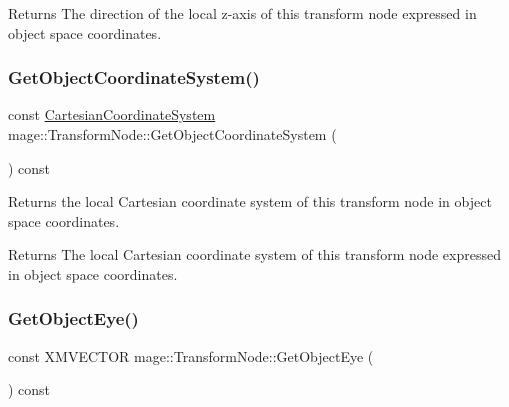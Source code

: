 \begin{DoxyReturn}{Returns}
The direction of the local z-\/axis of this transform node expressed in object space coordinates. 
\end{DoxyReturn}
\hypertarget{structmage_1_1_transform_node_a59417bfb21810840f90cee6a192e6ffd}{}\label{structmage_1_1_transform_node_a59417bfb21810840f90cee6a192e6ffd} 
\subsubsection{\texorpdfstring{Get\+Object\+Coordinate\+System()}{GetObjectCoordinateSystem()}}
{\footnotesize\ttfamily const \hyperlink{structmage_1_1_cartesian_coordinate_system}{Cartesian\+Coordinate\+System} mage\+::\+Transform\+Node\+::\+Get\+Object\+Coordinate\+System (\begin{DoxyParamCaption}{ }\end{DoxyParamCaption}) const\hspace{0.3cm}{\ttfamily [noexcept]}}

Returns the local Cartesian coordinate system of this transform node in object space coordinates.

\begin{DoxyReturn}{Returns}
The local Cartesian coordinate system of this transform node expressed in object space coordinates. 
\end{DoxyReturn}
\hypertarget{structmage_1_1_transform_node_a627c3494fb3bd47551bbc48ad64369f5}{}\label{structmage_1_1_transform_node_a627c3494fb3bd47551bbc48ad64369f5} 
\subsubsection{\texorpdfstring{Get\+Object\+Eye()}{GetObjectEye()}}
{\footnotesize\ttfamily const X\+M\+V\+E\+C\+T\+OR mage\+::\+Transform\+Node\+::\+Get\+Object\+Eye (\begin{DoxyParamCaption}{ }\end{DoxyParamCaption}) const\hspace{0.3cm}{\ttfamily [noexcept]}}

